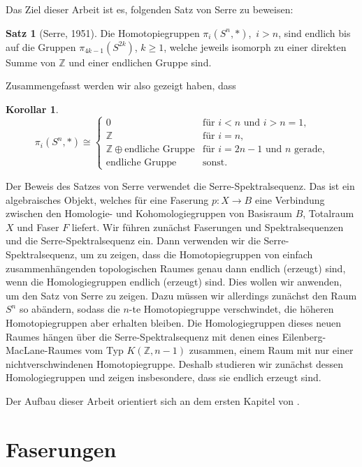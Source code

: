 \documentclass[11pt, a4paper, german]{article}
\theoremstyle{definition}
\newtheorem{satz}[lem]{Satz}
\newtheorem{kor}[lem]{Korollar}
\theoremstyle{remark}
\newcommand{\Z}{\mathbb{Z}} %
\begin{document}
Das Ziel dieser Arbeit ist es, folgenden Satz von Serre zu beweisen:

\begin{satz}[Serre, 1951]\label{serre}
  Die Homotopiegruppen $\pi_i(S^n, *)$,~$i > n$, sind endlich bis auf die Gruppen $\pi_{4k-1}(S^{2k})$, $k \geq 1$, welche jeweils isomorph zu einer direkten Summe von $\Z$ und einer endlichen Gruppe sind.
\end{satz}

Zusammengefasst werden wir also gezeigt haben, dass

\begin{kor}\mbox{}
  \vspace{-1.4em}
  \[
    \pi_i(S^n, *) \cong \begin{cases}
      0 & \text{für $i < n$ und $i > n = 1$,} \\
      \Z & \text{für $i = n$,} \\
      \Z \oplus \text{endliche Gruppe} & \text{für $i=2n-1$ und $n$ gerade,} \\
      \text{endliche Gruppe} & \text{sonst.}
    \end{cases}
  \]
\end{kor}

Der Beweis des Satzes von Serre verwendet die Serre-Spektralsequenz.
Das ist ein algebraisches Objekt, welches für eine Faserung $p : X \to B$ eine Verbindung zwischen den Homologie- und Kohomologiegruppen von Basisraum $B$, Totalraum $X$ und Faser $F$ liefert.
Wir führen zunächst Faserungen und Spektralsequenzen und die Serre-Spektralsequenz ein.
Dann verwenden wir die Serre-Spektralsequenz, um zu zeigen, dass die Homotopiegruppen von einfach zusammenhängenden topologischen Raumes genau dann endlich (erzeugt) sind, wenn die Homologiegruppen endlich (erzeugt) sind.
Dies wollen wir anwenden, um den Satz von Serre zu zeigen.
Dazu müssen wir allerdings zunächst den Raum $S^n$ so abändern, sodass die $n$-te Homotopiegruppe verschwindet, die höheren Homotopiegruppen aber erhalten bleiben.
Die Homologiegruppen dieses neuen Raumes hängen über die Serre-Spektralsequenz mit denen eines Eilenberg-MacLane-Raumes vom Typ $K(\Z, n{-}1)$ zusammen, einem Raum mit nur einer nichtverschwindenen Homotopiegruppe.
Deshalb studieren wir zunächst dessen Homologiegruppen und zeigen insbesondere, dass sie endlich erzeugt sind.

Der Aufbau dieser Arbeit orientiert sich an dem ersten Kapitel von \cite{hatcher:ss}.

\section{Faserungen}
\end{document}
